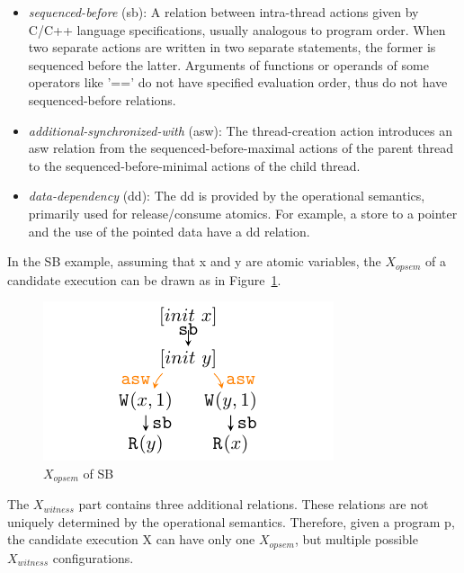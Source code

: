 \begin{itemize}
	\item \textit{sequenced-before} (sb): A relation between intra-thread actions given by C/C++ language specifications, usually analogous to program order. When two separate actions are written in two separate statements, the former is sequenced before the latter. Arguments of functions or operands of some operators like '==' do not have specified evaluation order, thus do not have sequenced-before relations.
	\item \textit{additional-synchronized-with} (asw): The thread-creation action introduces an asw relation from the sequenced-before-maximal actions of the parent thread to the sequenced-before-minimal actions of the child thread.
	\item \textit{data-dependency} (dd):  The dd is provided by the operational semantics, primarily used for release/consume atomics. For example, a store to a pointer and the use of the pointed data have a dd relation.
\end{itemize}

In the SB example,  assuming that x and y are atomic variables, the $X_{opsem}$ of a candidate execution can be drawn as in Figure~\ref{XopsemSB}.

\begin{figure}[h!tbp] %
	\centering
	\includegraphics[scale=1]{figure/exec-graph/SB1.pdf} %
	\caption{$X_{opsem}$ of SB} %
	\label{XopsemSB} %
\end{figure}

The $X_{witness}$ part contains three additional relations. These relations are not uniquely determined by the operational semantics. Therefore, given a program p, the candidate execution X can have only one $X_{opsem}$, but multiple possible $X_{witness}$ configurations.



